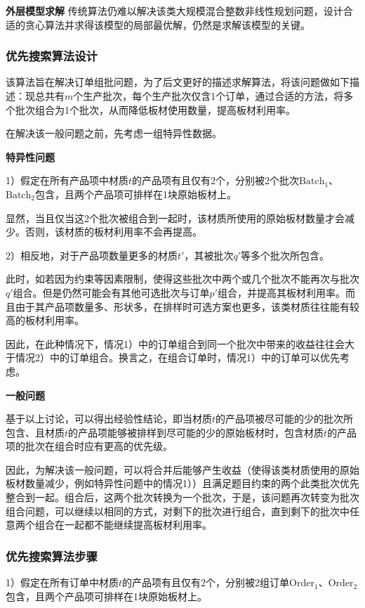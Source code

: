 \documentclass[bwprint]{gmcmthesis}
\begin{document}
	\textbf{外层模型求解} 传统算法仍难以解决该类大规模混合整数非线性规划问题，设计合适的贪心算法并求得该模型的局部最优解，仍然是求解该模型的关键。

\subsubsection{优先搜索算法设计}
该算法旨在解决订单组批问题，为了后文更好的描述求解算法，将该问题做如下描述：现总共有$m$个生产批次，每个生产批次仅含1个订单，通过合适的方法，将多个批次组合为1个批次，从而降低板材使用数量，提高板材利用率。

在解决该一般问题之前，先考虑一组特异性数据。

\textbf{特异性问题}

1）假定在所有产品项中材质$t$的产品项有且仅有2个，分别被2个批次$\text{Batch}_1$、$\text{Batch}_2$包含，且两个产品项可排样在1块原始板材上。

显然，当且仅当这2个批次被组合到一起时，该材质所使用的原始板材数量才会减少。否则，该材质的板材利用率不会再提高。

2）相反地，对于产品项数量更多的材质$t'$，其被批次$q'$等多个批次所包含。

此时，如若因为约束等因素限制，使得这些批次中两个或几个批次不能再次与批次$q'$组合。但是仍然可能会有其他可选批次与订单$p'$组合，并提高其板材利用率。而且由于其产品项数量多、形状多，在排样时可选方案也更多，该类材质往往能有较高的板材利用率。

因此，在此种情况下，情况1）中的订单组合到同一个批次中带来的收益往往会大于情况2）中的订单组合。换言之，在组合订单时，情况1）中的订单可以优先考虑。

\textbf{一般问题}

基于以上讨论，可以得出经验性结论，即当材质$t$的产品项被尽可能的少的批次所包含、且材质$t$的产品项能够被排样到尽可能的少的原始板材时，包含材质$t$的产品项的批次在组合时应有更高的优先级。

因此，为解决该一般问题，可以将合并后能够产生收益（使得该类材质使用的原始板材数量减少，例如特异性问题中的情况1））且满足题目约束的两个此类批次优先整合到一起。组合后，这两个批次转换为一个批次，于是，该问题再次转变为批次组合问题，可以继续以相同的方式，对剩下的批次进行组合，直到剩下的批次中任意两个组合在一起都不能继续提高板材利用率。



\subsubsection{优先搜索算法步骤}
1）假定在所有订单中材质$t$的产品项有且仅有2个，分别被2组订单$\text{Order}_1$、$\text{Order}_2$包含，且两个产品项可排样在1块原始板材上。
\end{document}
